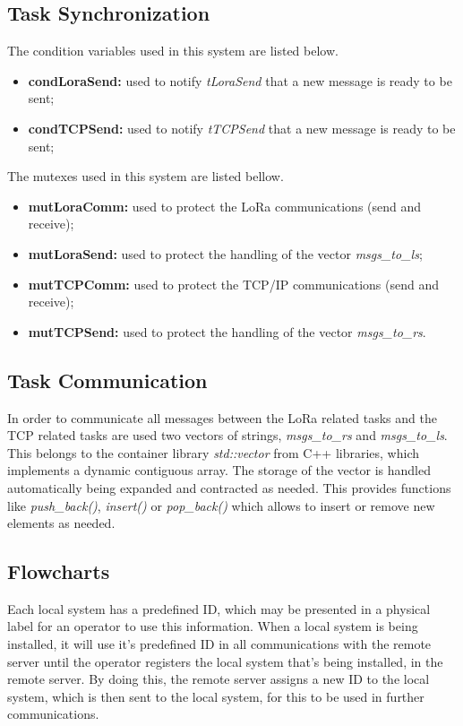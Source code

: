 \subsection{Task Synchronization}

The condition variables used in this system are listed below.

\begin{itemize}
	\item \textbf{condLoraSend:} used to notify \textit{tLoraSend} that a new message is ready to be sent;
	\item \textbf{condTCPSend:} used to notify \textit{tTCPSend} that a new message is ready to be sent;
\end{itemize}

The mutexes used in this system are listed bellow.

\begin{itemize}
	\item \textbf{mutLoraComm:} used to protect the LoRa communications (send and receive);
	\item \textbf{mutLoraSend:}	used to protect the handling of the vector \textit{msgs\_to\_ls};
	
	\item \textbf{mutTCPComm:} used to protect the TCP/IP communications (send and receive);
	\item \textbf{mutTCPSend:} used to protect the handling of the vector \textit{msgs\_to\_rs}.
\end{itemize}

\subsection{Task Communication}
In order to communicate all messages between the LoRa related tasks and the TCP related tasks are used two vectors of strings, \textit{msgs\_to\_rs} and \textit{msgs\_to\_ls}. This belongs to the container library \textit{std::vector} from C++ libraries, which implements a dynamic contiguous array. The storage of the vector is handled automatically being expanded and contracted as needed. This provides functions like \textit{push\_back()}, \textit{insert()} or \textit{pop\_back()} which allows to insert or remove new elements as needed.

\subsection{Flowcharts}
Each local system has a predefined ID, which may be presented in a physical label for an operator to use this information. When a local system is being installed, it will use it's predefined ID in all communications with the remote server until the operator registers the local system that's being installed, in the remote server. By doing this, the remote server assigns a new ID to the local system, which is then sent to the local system, for this to be used in further communications.

